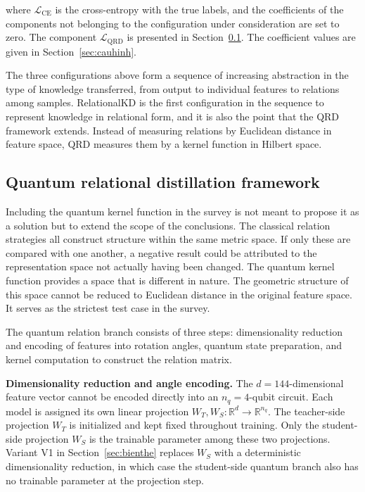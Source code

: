 where $\mathcal{L}_{\mathrm{CE}}$ is the cross-entropy with the true
labels, and the coefficients of the components not belonging to the
configuration under consideration are set to zero. The component
$\mathcal{L}_{\mathrm{QRD}}$ is presented in Section~\ref{sec:qrd}.
The coefficient values are given in Section~\ref{sec:cauhinh}.

The three configurations above form a sequence of increasing
abstraction in the type of knowledge transferred, from output to
individual features to relations among samples. RelationalKD is the
first configuration in the sequence to represent knowledge in
relational form, and it is also the point that the QRD framework
extends. Instead of measuring relations by Euclidean distance in
feature space, QRD measures them by a kernel function in Hilbert
space.

\subsection{Quantum relational distillation framework}
\label{sec:qrd}

Including the quantum kernel function in the survey is not meant to
propose it as a solution but to extend the scope of the conclusions.
The classical relation strategies all construct structure within the
same metric space. If only these are compared with one another, a
negative result could be attributed to the representation space not
actually having been changed. The quantum kernel function provides a
space that is different in nature. The geometric structure of this
space cannot be reduced to Euclidean distance in the original
feature space. It serves as the strictest test case in the survey.

The quantum relation branch consists of three steps: dimensionality
reduction and encoding of features into rotation angles, quantum
state preparation, and kernel computation to construct the relation
matrix.

\textbf{Dimensionality reduction and angle encoding.} The
$d = 144$-dimensional feature vector cannot be encoded directly into
an $n_q = 4$-qubit circuit. Each model is assigned its own linear
projection $W_T, W_S : \mathbb{R}^{d} \to \mathbb{R}^{n_q}$. The
teacher-side projection $W_T$ is initialized and kept fixed
throughout training. Only the student-side projection $W_S$ is the
trainable parameter among these two projections. Variant V1 in
Section~\ref{sec:bienthe} replaces $W_S$ with a deterministic
dimensionality reduction, in which case the student-side quantum
branch also has no trainable parameter at the projection step.


